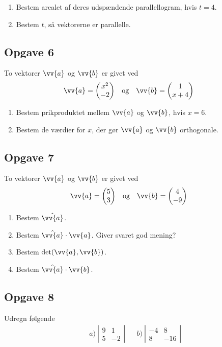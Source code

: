 \begin{enumerate}[label=\roman*)]
	\item Bestem arealet af deres udspændende parallellogram, hvis $t = 4$.
	\item Bestem $t$, så vektorerne er parallelle. 
\end{enumerate}

\subsection*{Opgave 6}
To vektorer $\vv{a}$ og $\vv{b}$ er givet ved
\begin{align*}
	&\vv{a} =	
	\begin{pmatrix}
		x^2 \\ -2
	\end{pmatrix}
	&
	&\textnormal{og}
	&
	&\vv{b} =
	\begin{pmatrix}
		1 \\ x+4
	\end{pmatrix}
\end{align*}

\begin{enumerate}[label=\roman*)]
	\item Bestem prikproduktet mellem $\vv{a}$ og $\vv{b}$, hvis $x = 6$.
	\item Bestem de værdier for $x$, der gør $\vv{a}$ og $\vv{b}$ orthogonale. 
\end{enumerate}

\subsection*{Opgave 7}
To vektorer $\vv{a}$ og $\vv{b}$ er givet ved
\begin{align*}
	&\vv{a} =	
	\begin{pmatrix}
		5 \\ 3
	\end{pmatrix}
	&
	&\textnormal{og}
	&
	&\vv{b} =
	\begin{pmatrix}
		4 \\ -9
	\end{pmatrix}
\end{align*}
\begin{enumerate}[label=\roman*)]
	\item Bestem $\hat{\vv{a}}$.
	\item Bestem $\hat{\vv{a}}\cdot \vv{a}$. Giver svaret god mening?
	\item Bestem $\det(\vv{a},\vv{b})$.
	\item Bestem $\hat{\vv{a}}\cdot \vv{b}$.
\end{enumerate}

\subsection*{Opgave 8}
Udregn følgende
\begin{align*}
	&a) \ 
	\left|
	\begin{array}{cc}
		9 & 1 \\
		5 & -2
	\end{array}
	\right|
	&
	&b) \
	\left|
	\begin{array}{cc}
		-4 & 8 \\
		8 & -16
	\end{array}
	\right|
\end{align*}
